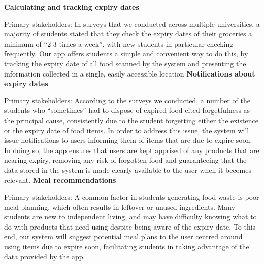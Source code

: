 \textbf{Calculating and tracking expiry dates}
\par
Primary stakeholders: In surveys that we conducted across multiple universities, a majority of students stated that they check the expiry dates of their groceries a minimum of “2-3 times a week”, with new students in particular checking frequently. Our app offers students a simple and convenient way to do this, by tracking the expiry date of all food scanned by the system and presenting the information collected in a single, easily accessible location
\newline 
\textbf{Notifications about expiry dates}
\par
Primary stakeholders: According to the surveys we conducted, a number of the students who “sometimes” had to dispose of expired food cited forgetfulness as the principal cause, consistently due to the student forgetting either the existence or the expiry date of food items. In order to address this issue, the system will issue notifications to users informing them of items that are due to expire soon. In doing so, the app ensures that users are kept apprised of any products that are nearing expiry, removing any risk of forgotten food and guaranteeing that the data stored in the system is made clearly available to the user when it becomes relevant.
\newline 
\textbf{Meal recommendations}
\par
Primary stakeholders: A common factor in students generating food waste is poor meal planning, which often results in leftover or unused ingredients. Many students are new to independent living, and may have difficulty knowing what to do with products that need using despite being aware of the expiry date. To this end, our system will suggest potential meal plans to the user centred around using items due to expire soon, facilitating students in taking advantage of the data provided by the app.

